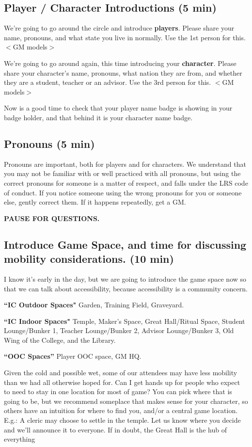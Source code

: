 \documentclass[green]{GL2020}
\begin{document}
\subsection*{Player / Character Introductions (5 min)}
We’re going to go around the circle and introduce \textbf{players}. Please share your name, pronouns, and what state you live in normally. Use the 1st person for this. $<$GM models$>$

We’re going to go around again, this time introducing your \textbf{character}. Please share your character’s name, pronouns, what nation they are from, and whether they are a student, teacher or an advisor. Use the 3rd person for this. $<$GM models$>$

Now is a good time to check that your player name badge is showing in your badge holder, and that behind it is your character name badge.


\subsection*{Pronouns (5 min)}
Pronouns are important, both for players and for characters. We understand that you may not be familiar with or well practiced with all pronouns, but using the correct pronouns for someone is a matter of respect, and falls under the LRS code of conduct. If you notice someone using the wrong pronouns for you or someone else, gently correct them. If it happens repeatedly, get a GM.

\textbf{PAUSE FOR QUESTIONS.}

\subsection*{Introduce Game Space, and time for discussing mobility considerations. (10 min)}
I know it's early in the day, but we are going to introduce the game space now so that we can talk about accessibility, because accessibility is a community concern.

\textbf{``IC Outdoor Spaces"} Garden, Training Field, Graveyard. 

\textbf{``IC Indoor Spaces"} Temple, Maker's Space, Great Hall/Ritual Space, Student Lounge/Bunker 1, Teacher Lounge/Bunker 2, Advisor Lounge/Bunker 3, Old Wing of the College, and the Library.

\textbf{``OOC Spaces''} Player OOC space, GM HQ.

Given the cold and possible wet, some of our attendees may have less mobility than we had all otherwise hoped for. Can I get hands up for people who expect to need to stay in one location for most of game? You can pick where that is going to be, but we recommend someplace that makes sense for your character, so others have an intuition for where to find you, and/or a central game location. E.g.: A cleric may choose to settle in the temple. Let us know where you decide and we'll announce it to everyone. If in doubt, the Great Hall is the hub of everything
\end{document}
